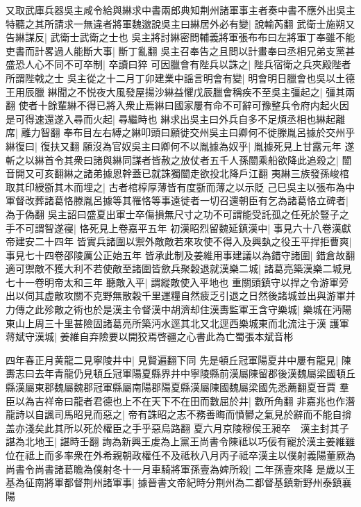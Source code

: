 又取武庫兵器吳主咸令給與綝求中書兩郎典知荆州諸軍事主者奏中書不應外出吳主特聽之其所請求一無違者將軍魏邈說吳主曰綝居外必有變|{
	說輸芮翻}
武衛士施朔又告綝謀反|{
	武衛士武衛之士也}
吳主將討綝密問輔義將軍張布布曰左將軍丁奉雖不能吏書而計畧過人能斷大事|{
	斷丁亂翻}
吳主召奉告之且問以計畫奉曰丞相兄弟支黨甚盛恐人心不同不可卒制|{
	卒讀曰猝}
可因臘會有陛兵以誅之|{
	陛兵宿衛之兵夾殿陛者所謂陛戟之士}
吳主從之十二月丁卯建業中謡言明會有變|{
	明會明日臘會也吳以土德王用辰臘}
綝聞之不悦夜大風發屋揚沙綝益懼戊辰臘會稱疾不至吳主彊起之|{
	彊其兩翻}
使者十餘輩綝不得已將入衆止焉綝曰國家屢有命不可辭可豫整兵令府内起火因是可得速還遂入尋而火起|{
	尋繼時也}
綝求出吳主曰外兵自多不足煩丞相也綝起離席|{
	離力智翻}
奉布目左右縛之綝叩頭曰願徙交州吳主曰卿何不徙滕胤呂據於交州乎綝復曰|{
	復扶又翻}
願沒為官奴吳主曰卿何不以胤據為奴乎|{
	胤據死見上甘露元年}
遂斬之以綝首令其衆曰諸與綝同謀者皆赦之放仗者五千人孫闓乘船欲降此追殺之|{
	闓音開又可亥翻綝之諸弟據恩幹蓋已就誅獨闓走欲投北降戶江翻}
夷綝三族發孫峻棺取其印綬斵其木而埋之|{
	古者棺椁厚薄皆有度斵而薄之以示貶}
己巳吳主以張布為中軍督改葬諸葛恪滕胤呂據等其罹恪等事遠徙者一切召還朝臣有乞為諸葛恪立碑者|{
	為于偽翻}
吳主詔曰盛夏出軍士卒傷損無尺寸之功不可謂能受託孤之任死於豎子之手不可謂智遂寑|{
	恪死見上卷嘉平五年}
初漢昭烈留魏延鎮漢中|{
	事見六十八卷漢獻帝建安二十四年}
皆實兵諸圍以禦外敵敵若來攻使不得入及興埶之役王平捍拒曹爽|{
	事見七十四卷邵陵厲公正始五年}
皆承此制及姜維用事建議以為錯守諸圍|{
	錯倉故翻}
適可禦敵不獲大利不若使敵至諸圍皆歛兵聚穀退就漢樂二城|{
	諸葛亮築漢樂二城見七十一卷明帝太和三年}
聽敵入平|{
	謂縱敵使入平地也}
重關頭鎮守以捍之令游軍旁出以伺其虚敵攻關不克野無散穀千里運糧自然疲乏引退之日然後諸城並出與游軍并力傳之此殄敵之術也於是漢主令督漢中胡濟却住漢夀監軍王含守樂城|{
	樂城在沔陽東山上周三十里甚險固諸葛亮所築沔水逕其北又北逕西樂城東而北流注于漢}
護軍蒋斌守漢城|{
	姜維自弃險要以開狡焉啓疆之心書此為亡蜀張本斌音彬}


四年春正月黄龍二見寧陵井中|{
	見賢遍翻下同}
先是頓丘冠軍陽夏井中屢有龍見|{
	陳夀志曰去年青龍仍見頓丘冠軍陽夏縣界井中寧陵縣前漢屬陳留郡後漢魏屬梁國頓丘縣漢屬東郡魏屬魏郡冠軍縣屬南陽郡陽夏縣漢屬陳國魏屬梁國先悉薦翻夏音賈}
羣臣以為吉祥帝曰龍者君德也上不在天下不在田而數屈於井|{
	數所角翻}
非嘉兆也作潛龍詩以自諷司馬昭見而惡之|{
	帝有誅昭之志不務善晦而憤鬰之氣見於辭而不能自揜盖亦淺矣此其所以死於權臣之手乎惡烏路翻}
夏六月京陵穆侯王昶卒　漢主封其子諶為北地王|{
	諶時壬翻}
詢為新興王䖍為上黨王尚書令陳祗以巧佞有寵於漢主姜維雖位在祗上而多率衆在外希親朝政權任不及祗秋八月丙子祗卒漢主以僕射義陽董厥為尚書令尚書諸葛瞻為僕射冬十一月車騎將軍孫壹為婢所殺|{
	二年孫壹來降}
是歲以王基為征南將軍都督荆州諸軍事|{
	據晉書文帝紀時分荆州為二都督基鎮新野州泰鎮襄陽}


